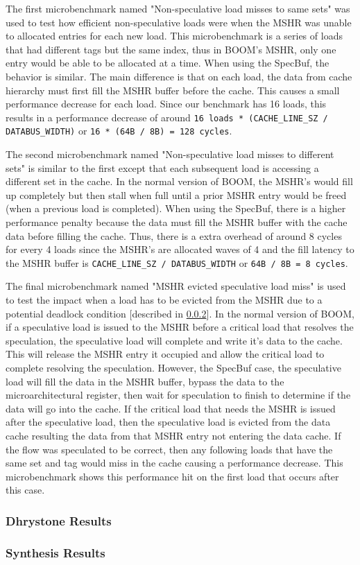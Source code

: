 The first microbenchmark named "Non-speculative load misses to same sets" was used to test how efficient non-speculative loads
were when the MSHR was unable to allocated entries for each new load. This microbenchmark is a series of loads that had different
tags but the same index, thus in BOOM's MSHR, only one entry would be able to be allocated at a time. When using the SpecBuf, the 
behavior is similar. The main difference is that on each load, the data from cache hierarchy must first fill the MSHR buffer
before the cache. This causes a small performance decrease for each load. Since our benchmark has 16 loads, this results in a performance decrease of around
{\tt 16 loads * (CACHE_LINE_SZ / DATABUS_WIDTH)} or {\tt 16 * (64B / 8B) = 128 cycles}.

The second microbenchmark named "Non-speculative load misses to different sets" is similar to the first except that each subsequent
load is accessing a different set in the cache. In the normal version of BOOM, the MSHR's would fill up completely but then stall 
when full until a prior MSHR entry would be freed (when a previous load is completed). When using the SpecBuf, there is a
higher performance penalty because the data must fill the MSHR buffer with the cache data before filling the cache. Thus, there 
is a extra overhead of around 8 cycles for every 4 loads since the MSHR's are allocated waves of 4 and the fill latency to the MSHR
buffer is {\tt CACHE_LINE_SZ / DATABUS_WIDTH} or {\tt 64B / 8B = 8 cycles}.

The final microbenchmark named "MSHR evicted speculative load miss" is used to test the impact when a load has to be evicted from the 
MSHR due to a potential deadlock condition [described in \ref{}]. In the normal version of BOOM, if a speculative load is issued to the 
MSHR before a critical load that resolves the speculation, the speculative load will complete and
write it's data to the cache. This will release the MSHR entry it occupied and allow the critical load to complete resolving the speculation. 
However, the SpecBuf case, the speculative load will fill the data in the MSHR buffer, bypass the data to the microarchitectural register, 
then wait for speculation to finish to determine if the data will go into the cache. If the critical load that needs the MSHR is issued after the speculative load,
then the speculative load is evicted from the data cache resulting the data from that MSHR entry not entering the data cache. If the 
flow was speculated to be correct, then any following loads that have the same set and tag would miss in the cache causing a performance decrease.
This microbenchmark shows this performance hit on the first load that occurs after this case.

\subsubsection{Dhrystone Results}

\subsubsection{Synthesis Results}


